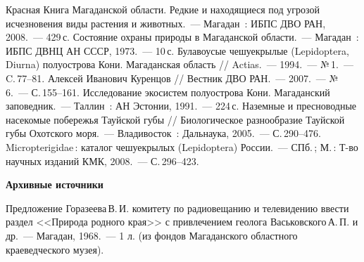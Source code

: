 \begin{thebibliography}{99}

\bibitem{} Красная Книга Магаданской области. Редкие и находящиеся под угрозой исчезновения виды растения и животных.~--- Магадан~: ИБПС ДВО РАН, 2008.~--- 429\,с.
\bibitem{} Состояние охраны природы в Магаданской области.~--- Магадан~: ИБПС ДВНЦ АН СССР, 1973.~--- 10\,с.
\bibitem{} Булавоусые чешуекрылые (Lepidoptera, Diurna) полуострова Кони. Магаданская область // Actias.~--- 1994.~--- №\,1.~--- C.\,77--81.
\bibitem{} Алексей Иванович Куренцов // Вестник ДВО РАН.~--- 2007.~--- №\,6.~--- С.\,155--161.
\bibitem{} Исследование экосистем полуострова Кони. Магаданский заповедник.~--- Таллин~: АН Эстонии, 1991.~--- 224\,с.
\bibitem{} Наземные и пресноводные насекомые побережья Тауйской губы // Биологическое разнообразие Тауйской губы Охотского моря.~--- Владивосток~: Дальнаука, 2005.~--- С.\,290--476.
\bibitem{} Micropterigidae\,: каталог чешуекрылых (Lepidoptera) России.~--- СПб.\,; М.\,: Т-во научных изданий КМК, 2008.~--- С.\,296--423.

\textbf{Архивные источники}

\bibitem{}Предложение Горазеева\,В.\,И. комитету по радиовещанию и телевидению ввести раздел <<Природа родного края>> с привлечением геолога Васьковского\,А.\,П. и др.~--- Магадан, 1968.~--- 1 л. (из фондов Магаданского областного краеведческого музея).
\end{thebibliography}
